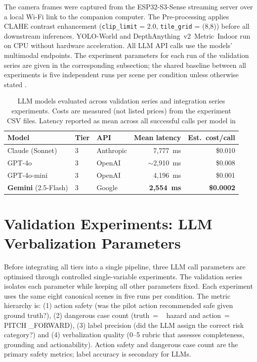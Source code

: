 The camera frames were captured from the ESP32-S3-Sense streaming server over a local Wi-Fi link to the companion computer.
The Pre-processing applies CLAHE contrast enhancement \cite{clahe_zuiderveld1994} (\texttt{clip\_limit} = 2.0, \texttt{tile\_grid} = (8,8)) before all downstream inferences. 
YOLO-World and DepthAnything~v2~Metric~Indoor run on CPU without
hardware acceleration. 
All LLM API calls use the models' multimodal endpoints.
The experiment parameters for each run of the validation series are given in the corresponding subsection; the shared baseline between all experiments is five independent runs per scene per condition unless otherwise stated \cite{liang2023helm}.

\begin{table}[ht]
  \caption{LLM models evaluated across validation series and integration series experiments.
  Costs are measured (not listed prices) from the experiment CSV files.
  Latency reported as mean across all successful calls per model in}
  \label{tab:ch2_models}
  \centering
  \small
  \begin{tabular}{lllrr}
    \toprule
    Model & Tier & API & Mean latency & Est.\ cost/call \\
    \midrule
    Claude (Sonnet)   & 3 & Anthropic & 7,777~ms & \$0.010 \\
    GPT-4o            & 3 & OpenAI    & $\sim$2,910~ms & \$0.008 \\
    GPT-4o-mini       & 3 & OpenAI    & 4,196~ms & \$0.001 \\
    \textbf{Gemini} (2.5-Flash)  & 3 & Google  & \textbf{2,554~ms} & \textbf{\$0.0002} \\
    \bottomrule
  \end{tabular}
\end{table}


\section{Validation Experiments: LLM Verbalization Parameters}
\label{sec:ch2_validation}

Before integrating all tiers into a single pipeline, three LLM call parameters are optimised through controlled single-variable experiments. 
The validation series isolates each parameter while keeping all other parameters fixed. 
Each experiment uses the same eight canonical scenes in five runs per condition. 
The metric hierarchy is: (1) action safety (was the pilot action recommended safe given ground truth?), (2) dangerous case count (truth~= ~ hazard and action~= ~ PITCH \_FORWARD), (3) label precision (did the LLM assign the correct risk category?) and
(4) verbalization quality (0--5 rubric that assesses completeness, grounding and actionability). 
Action safety and dangerous case count are the primary safety metrics; label accuracy is secondary for LLMs.

